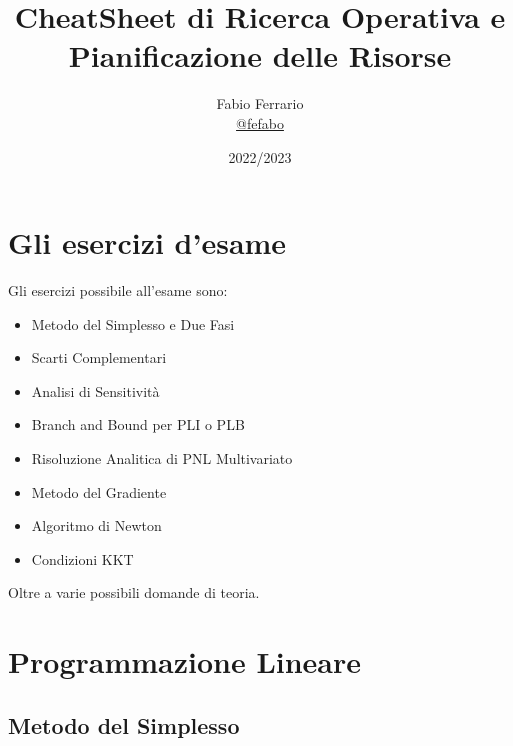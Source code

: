\documentclass[12pt, a4paper, openany]{book}
\begin{document}
\title{CheatSheet di Ricerca Operativa e Pianificazione delle Risorse}

\author{
	Fabio Ferrario\\
	\small{\href{https://t.me/fefabo}{@fefabo}}
}
\date{2022/2023}

\maketitle

\tableofcontents
\chapter{Gli esercizi d'esame}
Gli esercizi possibile all'esame sono:
\begin{itemize}
	\item Metodo del Simplesso e Due Fasi
	\item Scarti Complementari
	\item Analisi di Sensitività
	\item Branch and Bound per PLI o PLB
	\item Risoluzione Analitica di PNL Multivariato
	\item Metodo del Gradiente
	\item Algoritmo di Newton
	\item Condizioni KKT
\end{itemize}

Oltre a varie possibili domande di teoria.

\chapter{Programmazione Lineare}
\section{Metodo del Simplesso}

\end{document}
